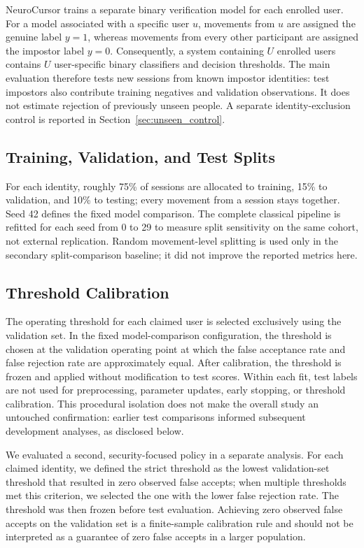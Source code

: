 \documentclass[conference]{IEEEtran}
\begin{document}
NeuroCursor trains a separate binary verification model for each enrolled user. For a model associated with a specific user $u$, movements from $u$ are assigned the genuine label $y=1$, whereas movements from every other participant are assigned the impostor label $y=0$. Consequently, a system containing $U$ enrolled users contains $U$ user-specific binary classifiers and decision thresholds.
The main evaluation therefore tests new sessions from known impostor identities:
test impostors also contribute training negatives and validation observations.
It does not estimate rejection of previously unseen people. A separate
identity-exclusion control is reported in Section~\ref{sec:unseen_control}.

\subsection{Training, Validation, and Test Splits}

For each identity, roughly 75\% of sessions are allocated to training,
15\% to validation, and 10\% to testing; every movement from a session stays
together. Seed 42 defines the fixed model comparison. The complete classical
pipeline is refitted for each seed from 0 to 29 to measure split sensitivity
on the same cohort, not external replication. Random movement-level splitting
is used only in the secondary split-comparison baseline; it did not improve
the reported metrics here.

\subsection{Threshold Calibration}

The operating threshold for each claimed user is selected exclusively using the validation set. In the fixed model-comparison configuration, the threshold is chosen at the validation operating point at which the false acceptance rate and false rejection rate are approximately equal. After calibration, the threshold is frozen and applied without modification to test scores. Within each fit, test labels are not used for preprocessing, parameter updates, early stopping, or threshold calibration. This procedural isolation does not make the overall study an untouched confirmation: earlier test comparisons informed subsequent development analyses, as disclosed below.

We evaluated a second, security-focused policy in a separate analysis. For each claimed identity, we defined the strict threshold as the lowest validation-set threshold that resulted in zero observed false accepts; when multiple thresholds met this criterion, we selected the one with the lower false rejection rate. The threshold was then frozen before test evaluation. Achieving zero observed false accepts on the validation set is a finite-sample calibration rule and should not be interpreted as a guarantee of zero false accepts in a larger population.
\end{document}
